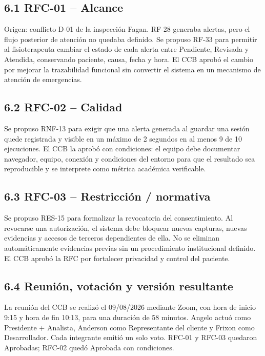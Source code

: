 \documentclass[12pt]{article}
\begin{document}
\subsection{\texorpdfstring{6.1 RFC-01 -- Alcance}{6.1 RFC-01 -- Alcance}}\label{rfc-01-alcance}

Origen: conflicto D-01 de la inspección Fagan. RF-28 generaba alertas, pero el flujo posterior de atención no quedaba definido. Se propuso RF-33 para permitir al fisioterapeuta cambiar el estado de cada alerta entre Pendiente, Revisada y Atendida, conservando paciente, causa, fecha y hora. El CCB aprobó el cambio por mejorar la trazabilidad funcional sin convertir el sistema en un mecanismo de atención de emergencias.

\subsection{\texorpdfstring{6.2 RFC-02 -- Calidad}{6.2 RFC-02 -- Calidad}}\label{rfc-02-calidad}

Se propuso RNF-13 para exigir que una alerta generada al guardar una sesión quede registrada y visible en un máximo de 2 segundos en al menos 9 de 10 ejecuciones. El CCB la aprobó con condiciones: el equipo debe documentar navegador, equipo, conexión y condiciones del entorno para que el resultado sea reproducible y se interprete como métrica académica verificable.

\subsection{\texorpdfstring{6.3 RFC-03 -- Restricción / normativa}{6.3 RFC-03 -- Restricción / normativa}}\label{rfc-03-restricciuxf3n-normativa}

Se propuso RES-15 para formalizar la revocatoria del consentimiento. Al revocarse una autorización, el sistema debe bloquear nuevas capturas, nuevas evidencias y accesos de terceros dependientes de ella. No se eliminan automáticamente evidencias previas sin un procedimiento institucional definido. El CCB aprobó la RFC por fortalecer privacidad y control del paciente.

\subsection{\texorpdfstring{6.4 Reunión, votación y versión resultante}{6.4 Reunión, votación y versión resultante}}\label{reuniuxf3n-votaciuxf3n-y-versiuxf3n-resultante}

La reunión del CCB se realizó el 09/08/2026 mediante Zoom, con hora de inicio 9:15 y hora de fin 10:13, para una duración de 58 minutos. Angelo actuó como Presidente + Analista, Anderson como Representante del cliente y Frixon como Desarrollador. Cada integrante emitió un solo voto. RFC-01 y RFC-03 quedaron Aprobadas; RFC-02 quedó Aprobada con condiciones.
\end{document}
